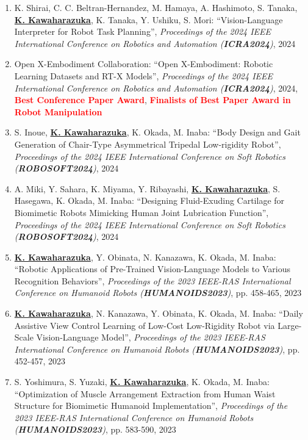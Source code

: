 \documentclass[letterpaper]{article}
\begin{document}
\begin{enumerate}
\item K. Shirai, C. C. Beltran-Hernandez, M. Hamaya, A. Hashimoto, S. Tanaka, \underline{\textbf{K. Kawaharazuka}}, K. Tanaka, Y. Ushiku, S. Mori: ``Vision-Language Interpreter for Robot Task Planning'', \textit{Proceedings of the 2024 IEEE International Conference on Robotics and Automation (\textit{\textbf{ICRA2024}})}, 2024
\item Open X-Embodiment Collaboration: ``Open X-Embodiment: Robotic Learning Datasets and RT-X Models'', \textit{Proceedings of the 2024 IEEE International Conference on Robotics and Automation (\textit{\textbf{ICRA2024}})}, 2024, \textbf{\textcolor{red}{Best Conference Paper Award}}, \textbf{\textcolor{red}{Finalists of Best Paper Award in Robot Manipulation}}
\item S. Inoue, \underline{\textbf{K. Kawaharazuka}}, K. Okada, M. Inaba: ``Body Design and Gait Generation of Chair-Type Asymmetrical Tripedal Low-rigidity Robot'', \textit{Proceedings of the 2024 IEEE International Conference on Soft Robotics (\textit{\textbf{ROBOSOFT2024}})}, 2024
\item A. Miki, Y. Sahara, K. Miyama, Y. Ribayashi, \underline{\textbf{K. Kawaharazuka}}, S. Hasegawa, K. Okada, M. Inaba: ``Designing Fluid-Exuding Cartilage for Biomimetic Robots Mimicking Human Joint Lubrication Function'', \textit{Proceedings of the 2024 IEEE International Conference on Soft Robotics (\textit{\textbf{ROBOSOFT2024}})}, 2024
\item \underline{\textbf{K. Kawaharazuka}}, Y. Obinata, N. Kanazawa, K. Okada, M. Inaba: ``Robotic Applications of Pre-Trained Vision-Language Models to Various Recognition Behaviors'', \textit{Proceedings of the 2023 IEEE-RAS International Conference on Humanoid Robots (\textit{\textbf{HUMANOIDS2023}})}, pp. 458-465, 2023
\item \underline{\textbf{K. Kawaharazuka}}, N. Kanazawa, Y. Obinata, K. Okada, M. Inaba: ``Daily Assistive View Control Learning of Low-Cost Low-Rigidity Robot via Large-Scale Vision-Language Model'', \textit{Proceedings of the 2023 IEEE-RAS International Conference on Humanoid Robots (\textit{\textbf{HUMANOIDS2023}})}, pp. 452-457, 2023
\item S. Yoshimura, S. Yuzaki, \underline{\textbf{K. Kawaharazuka}}, K. Okada, M. Inaba: ``Optimization of Muscle Arrangement Extraction from Human Waist Structure for Biomimetic Humanoid Implementation'', \textit{Proceedings of the 2023 IEEE-RAS International Conference on Humanoid Robots (\textit{\textbf{HUMANOIDS2023}})}, pp. 583-590, 2023

\end{enumerate}
\end{document}

